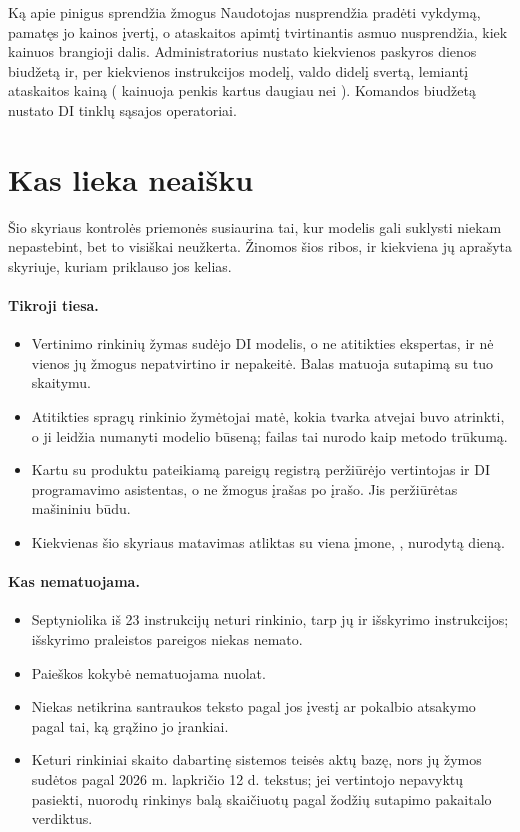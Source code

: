 \begin{humanbox}{Ką apie pinigus sprendžia žmogus}
Naudotojas nusprendžia pradėti vykdymą, pamatęs jo kainos įvertį, o ataskaitos apimtį
tvirtinantis asmuo nusprendžia, kiek kainuos brangioji dalis. Administratorius nustato
kiekvienos paskyros dienos biudžetą ir, per kiekvienos instrukcijos modelį, valdo didelį
svertą, lemiantį ataskaitos kainą ( kainuoja penkis kartus daugiau nei
). Komandos biudžetą nustato DI tinklų sąsajos operatoriai.
\end{humanbox}


\section{Kas lieka neaišku}\label{sec:control:limits}

Šio skyriaus kontrolės priemonės susiaurina tai, kur modelis gali suklysti niekam nepastebint,
bet to visiškai neužkerta. Žinomos šios ribos, ir kiekviena jų aprašyta skyriuje, kuriam
priklauso jos kelias.

\paragraph{Tikroji tiesa.}
\begin{itemize}
  \item Vertinimo rinkinių žymas sudėjo DI modelis, o ne atitikties ekspertas, ir nė vienos
    jų žmogus nepatvirtino ir nepakeitė. Balas matuoja sutapimą su tuo skaitymu.
  \item Atitikties spragų rinkinio žymėtojai matė, kokia tvarka atvejai buvo atrinkti, o ji
    leidžia numanyti modelio būseną; failas tai nurodo kaip metodo trūkumą.
  \item Kartu su produktu pateikiamą pareigų registrą peržiūrėjo vertintojas ir DI
    programavimo asistentas, o ne žmogus įrašas po įrašo. Jis peržiūrėtas mašininiu būdu.
  \item Kiekvienas šio skyriaus matavimas atliktas su viena įmone, \demo, nurodytą dieną.
\end{itemize}

\paragraph{Kas nematuojama.}
\begin{itemize}
  \item Septyniolika iš 23 instrukcijų neturi rinkinio, tarp jų ir išskyrimo instrukcijos;
    išskyrimo praleistos pareigos niekas nemato.
  \item Paieškos kokybė nematuojama nuolat.
  \item Niekas netikrina santraukos teksto pagal jos įvestį ar pokalbio atsakymo pagal tai,
    ką grąžino jo įrankiai.
  \item Keturi rinkiniai skaito dabartinę sistemos teisės aktų bazę, nors jų žymos sudėtos
    pagal 2026 m. lapkričio 12 d. tekstus; jei vertintojo nepavyktų pasiekti, nuorodų
    rinkinys balą skaičiuotų pagal žodžių sutapimo pakaitalo verdiktus.
\end{itemize}

